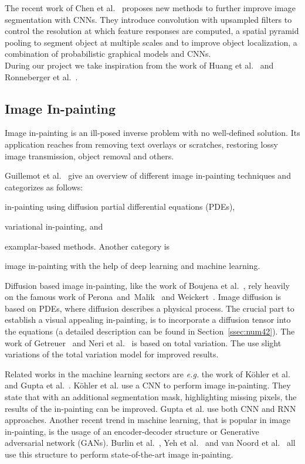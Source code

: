 The recent work of Chen et al.~\cite{Chen18} proposes new methods to further improve image segmentation with CNNs. They introduce convolution with upsampled filters to control the resolution at which feature responses are computed, a spatial pyramid pooling to segment object at multiple scales and to improve object localization, a combination of probabilistic  graphical models and CNNs.\\

During our project we take inspiration from the work of Huang et al.~\cite{Huang16} and Ronneberger et al.~\cite{Ronneberger15}.
 


\subsection{Image In-painting}
\label{ssec:num22}

Image in-painting is an ill-posed inverse problem with no well-defined solution. Its application reaches from removing text overlays or scratches, restoring lossy image transmission, object removal and others. 

Guillemot et al.~\cite{Guillemot2014} give an overview of different image in-painting techniques and categorizes as follows: \begin{enumerate*}[label=(\roman*)] \item in-painting using diffusion partial differential equations (PDEs), \item variational in-painting,  and \item examplar-based methods. Another category is \item image in-painting with the help of deep learning and machine learning. \end{enumerate*}

Diffusion based image in-painting, like the work of Boujena et al.~\cite{Boujena15}, rely heavily on the famous work of Perona~and~Malik~\cite{Perona90} and Weickert~\cite{weickert98}. Image diffusion is based on PDEs, where diffusion describes a physical process. The crucial part to establish a visual appealing in-painting, is to incorporate a diffusion tensor into the equations (a detailed description can be found in Section~\ref{ssec:num42}).
The work of Getreuer~\cite{getreuer12} and Neri et al.~\cite{Neri14} is based on total variation. The use slight variations of the total variation model for improved results. 

Related works in the machine learning sectors are \textit{e.g.} the work of Köhler et al.~\cite{Koehler14} and Gupta et al.~\cite{gupta17}. Köhler et al. use a CNN to perform image in-painting. They state that with an additional segmentation mask, highlighting missing pixels, the results of the in-painting can be improved. Gupta et al. use both CNN and RNN approaches.
Another recent trend in machine learning, that is popular in image in-painting, is the usage of an encoder-decoder structure or Generative adversarial network (GANs). Burlin et al.~\cite{burlin17}, Yeh et al.~\cite{Yeh17} and van Noord et al.~\cite{vanNoord18} all use this structure to perform state-of-the-art image in-painting.




